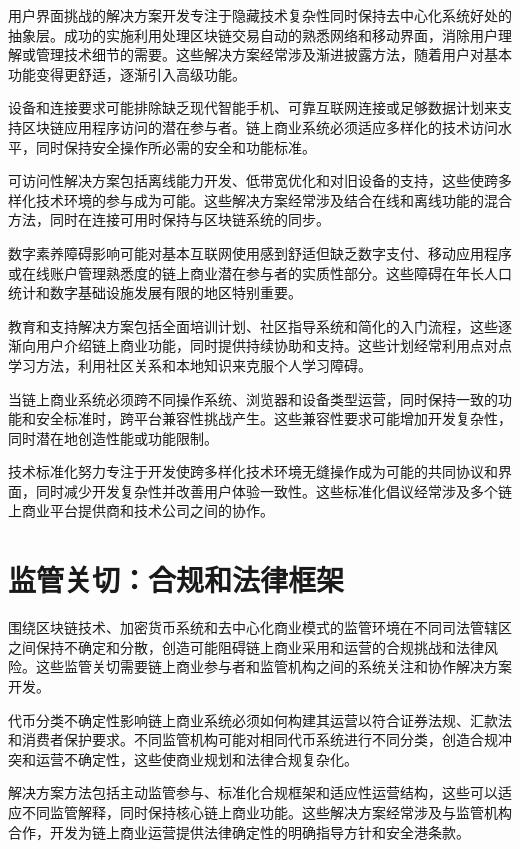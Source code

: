\documentclass[
  Letterpaper,
]{scrbook}
\begin{document}
用户界面挑战的解决方案开发专注于隐藏技术复杂性同时保持去中心化系统好处的抽象层。成功的实施利用处理区块链交易自动的熟悉网络和移动界面，消除用户理解或管理技术细节的需要。这些解决方案经常涉及渐进披露方法，随着用户对基本功能变得更舒适，逐渐引入高级功能。

设备和连接要求可能排除缺乏现代智能手机、可靠互联网连接或足够数据计划来支持区块链应用程序访问的潜在参与者。链上商业系统必须适应多样化的技术访问水平，同时保持安全操作所必需的安全和功能标准。

可访问性解决方案包括离线能力开发、低带宽优化和对旧设备的支持，这些使跨多样化技术环境的参与成为可能。这些解决方案经常涉及结合在线和离线功能的混合方法，同时在连接可用时保持与区块链系统的同步。

数字素养障碍影响可能对基本互联网使用感到舒适但缺乏数字支付、移动应用程序或在线账户管理熟悉度的链上商业潜在参与者的实质性部分。这些障碍在年长人口统计和数字基础设施发展有限的地区特别重要。

教育和支持解决方案包括全面培训计划、社区指导系统和简化的入门流程，这些逐渐向用户介绍链上商业功能，同时提供持续协助和支持。这些计划经常利用点对点学习方法，利用社区关系和本地知识来克服个人学习障碍。

当链上商业系统必须跨不同操作系统、浏览器和设备类型运营，同时保持一致的功能和安全标准时，跨平台兼容性挑战产生。这些兼容性要求可能增加开发复杂性，同时潜在地创造性能或功能限制。

技术标准化努力专注于开发使跨多样化技术环境无缝操作成为可能的共同协议和界面，同时减少开发复杂性并改善用户体验一致性。这些标准化倡议经常涉及多个链上商业平台提供商和技术公司之间的协作。

\section{监管关切：合规和法律框架}\label{ux76d1ux7ba1ux5173ux5207ux5408ux89c4ux548cux6cd5ux5f8bux6846ux67b6}

围绕区块链技术、加密货币系统和去中心化商业模式的监管环境在不同司法管辖区之间保持不确定和分散，创造可能阻碍链上商业采用和运营的合规挑战和法律风险。这些监管关切需要链上商业参与者和监管机构之间的系统关注和协作解决方案开发。

代币分类不确定性影响链上商业系统必须如何构建其运营以符合证券法规、汇款法和消费者保护要求。不同监管机构可能对相同代币系统进行不同分类，创造合规冲突和运营不确定性，这些使商业规划和法律合规复杂化。

解决方案方法包括主动监管参与、标准化合规框架和适应性运营结构，这些可以适应不同监管解释，同时保持核心链上商业功能。这些解决方案经常涉及与监管机构合作，开发为链上商业运营提供法律确定性的明确指导方针和安全港条款。
\end{document}
